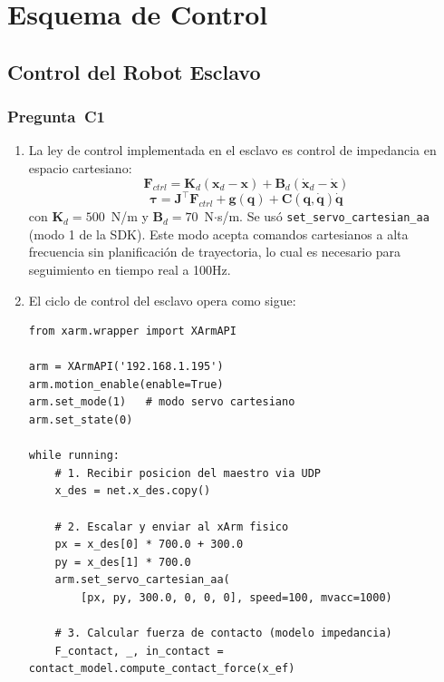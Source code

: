 \documentclass[journal,10pt,twoside]{IEEEtran}
\begin{document}
\section{Esquema de Control}
\label{sec:control}

\subsection{Control del Robot Esclavo}

\subsubsection*{Pregunta~C1}

\begin{enumerate}[label=(\alph*)]

\item La ley de control implementada en el esclavo es control de impedancia
en espacio cartesiano:
\[
\bm{F}_{ctrl} = \bm{K}_d(\bm{x}_d - \bm{x}) + \bm{B}_d(\dot{\bm{x}}_d - \dot{\bm{x}})
\]
\[
\bm{\tau} = \bm{J}^\top \bm{F}_{ctrl} + \bm{g}(\bm{q}) + \bm{C}(\bm{q},\dot{\bm{q}})\dot{\bm{q}}
\]
con $\bm{K}_d = 500$~N/m y $\bm{B}_d = 70$~N$\cdot$s/m.
Se usó \texttt{set\_servo\_cartesian\_aa} (modo 1 de la SDK). Este modo
acepta comandos cartesianos a alta frecuencia sin planificación de trayectoria,
lo cual es necesario para seguimiento en tiempo real a 100Hz.

\item El ciclo de control del esclavo opera como sigue:

\begin{lstlisting}[caption={Ciclo de control del robot Esclavo},
                   label={lst:slave}]
from xarm.wrapper import XArmAPI

arm = XArmAPI('192.168.1.195')
arm.motion_enable(enable=True)
arm.set_mode(1)   # modo servo cartesiano
arm.set_state(0)

while running:
    # 1. Recibir posicion del maestro via UDP
    x_des = net.x_des.copy()

    # 2. Escalar y enviar al xArm fisico
    px = x_des[0] * 700.0 + 300.0
    py = x_des[1] * 700.0
    arm.set_servo_cartesian_aa(
        [px, py, 300.0, 0, 0, 0], speed=100, mvacc=1000)

    # 3. Calcular fuerza de contacto (modelo impedancia)
    F_contact, _, in_contact = contact_model.compute_contact_force(x_ef)


\end{lstlisting}
\end{enumerate}
\end{document}
